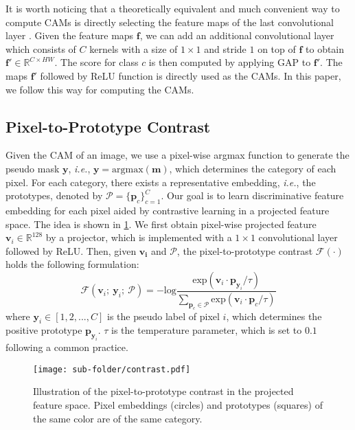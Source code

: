 \documentclass[10pt,twocolumn,letterpaper]{article}
\begin{document}
It is worth noticing that a theoretically equivalent and much convenient way to compute CAMs is directly selecting the feature maps of the last convolutional layer \cite{zhang2018adversarialCAMfirst}. Given the feature maps $\boldsymbol{f}$, we can add an additional convolutional layer which consists of $C$ kernels with a size of $1 \times 1$ and stride $1$ on top of $\boldsymbol{f}$ to obtain $\boldsymbol{f}' \in \mathbb{R}^{C\times HW}$. The score for class $c$ is then computed by applying GAP to $\boldsymbol{f}'$. The maps $\boldsymbol{f}'$ followed by ReLU function is directly used as the CAMs. 
In this paper, we follow this way for computing the CAMs.


\subsection{Pixel-to-Prototype Contrast}
Given the CAM of an image, we use a pixel-wise argmax function to generate the pseudo mask $\boldsymbol{y}$, \textit{i.e.}, $\boldsymbol{y} = \text{argmax}(\boldsymbol{m})$, which determines the category of each pixel.
For each category, there exists a representative embedding, \textit{i.e.}, the prototypes, denoted by $\mathcal{P} = \{\boldsymbol{p}_{c} \}_{c=1}^C$.
Our goal is to learn discriminative feature embedding for each pixel aided by contrastive learning in a projected feature space.
The idea is shown in \cref{fig:contrast}.
We first obtain pixel-wise projected feature $\boldsymbol{v}_i \in \mathbb{R}^{128}$ by a projector, which is implemented with a $1\times 1$ convolutional layer followed by ReLU. 
Then, given $\boldsymbol{v_i}$ and $\mathcal{P}$, the pixel-to-prototype contrast $\mathcal{F}(\cdot)$ holds the following formulation:
\begin{equation}
    \mathcal{F}(\boldsymbol{v}_i;\ \boldsymbol{y}_i;\ \mathcal{P}) = -\text{log} \frac{\text{exp}(\boldsymbol{v}_i \cdot \boldsymbol{p}_{\boldsymbol{y}_i} / \tau)}{\sum_{\boldsymbol{p}_c \in \mathcal{P}} \text{exp}(\boldsymbol{v}_i \cdot \boldsymbol{p}_c / \tau) }
    \label{CL-Loss}
\end{equation}
where $\boldsymbol{y}_i \in [1,2,...,C]$ is the pseudo label of pixel $i$, which determines the positive prototype $\boldsymbol{p}_{\boldsymbol{y}_i}$.
$\tau$ is the temperature parameter, which is set to $0.1$ following a common practice.
\begin{figure}[t]
\centering
\begin{center}
\texttt{[image: sub-folder/contrast.pdf]}
\end{center}
\caption{Illustration of the pixel-to-prototype contrast in the projected feature space. Pixel embeddings (circles) and prototypes (squares) of the same color are of the same category.}
\label{fig:contrast}
\end{figure}
\end{document}

